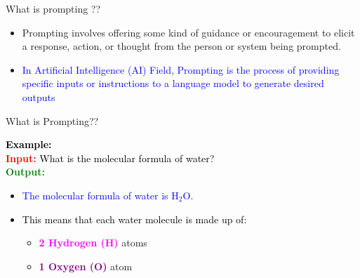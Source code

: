 \documentclass[aspectratio=169, xcolor={dvipsnames}, 10pt, brazil]{beamer}
\begin{document}
\begin{frame}{What is prompting ??}

    \begin{itemize}
		\item Prompting involves offering some kind of guidance or encouragement to elicit a response, action, or thought from the person or system being prompted.
		\item \textcolor{blue}{In Artificial Intelligence (AI) Field,
            Prompting is the process of providing specific inputs or instructions to a language model to generate desired outputs}
	\end{itemize}
\end{frame}
\begin{frame}{What is Prompting??}

    \textbf{\textcolor{Black}{\Large{Example:}}}\\
    \vspace{0.3cm}
    \textbf{\textcolor{red}{Input:}} \textcolor{black}{What is the molecular formula of water?}\\
    \vspace{0.5cm}
    \textbf{\textcolor{green}{Output:}}
    \begin{itemize}
       \item[] \hspace{1cm} \textcolor{blue}{The molecular formula of water is \( \mathrm{H_2O} \).}         
        \item[] \hspace{1cm} \textcolor{black}{This means that each water molecule is made up of:}

        \begin{itemize}
            \item[] \hspace{1cm} \textbf{\textcolor{magenta}{2 Hydrogen (H)}} atoms
            \item[] \hspace{1cm} \textbf{\textcolor{purple}{1 Oxygen (O)}} atom
        \end{itemize}
    \end{itemize}

\end{frame}
\end{document}
